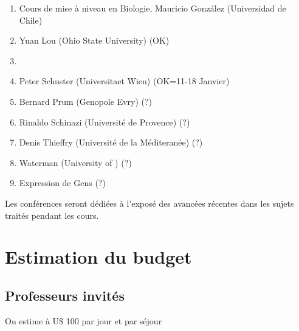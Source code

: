 \documentclass{amsart}
\begin{document}
\vskip 0.3cm
\begin{enumerate}
\item Cours de mise \`a niveau en Biologie, Mauricio Gonz\'alez
(Universidad de Chile)
\item Yuan Lou (Ohio State University) (OK)
\item
\item Peter Schuster (Universitaet Wien) (OK=11-18 Janvier)
\item Bernard Prum (Genopole Evry) (?)

\item Rinaldo Schinazi (Universit\'e de Provence) (?)
\item Denis Thieffry (Universit\'e de la M\'editeran\'ee) (?)
\item Waterman (University of ) (?)
\item Expression de Gens (?)
\end{enumerate}

Les conf\'erences seront d\'edi\'ees \`a l'expos\'e des avanc\'ees
r\'ecentes dans les sujets trait\'es pendant les cours.

\section{Estimation du budget}
\subsection{Professeurs invit\'es}
On estime \`a U\$ 100 par jour et par s\'ejour
\end{document}
